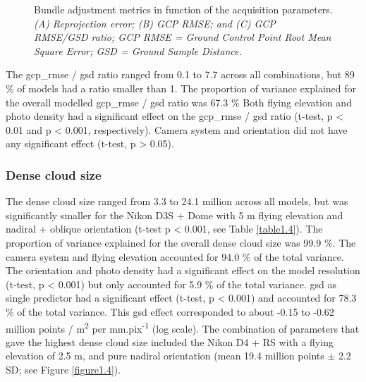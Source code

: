 \begin{figure}[ht]
	\caption[Bundle adjustment metrics in function of the acquisition parameters.]{Bundle adjustment metrics in function of the acquisition parameters. \textit{(A) Reprojection error; (B) GCP RMSE; and (C) GCP RMSE/GSD ratio; GCP RMSE = Ground Control Point Root Mean Square Error; GSD = Ground Sample Distance.}}
	\label{figure1.3}
    
\end{figure}

The \acrshort{gcp_rmse} / \acrshort{gsd} ratio ranged from 0.1 to 7.7 across all combinations, but 89 \% of models had a ratio smaller than 1. The proportion of variance explained for the overall modelled \acrshort{gcp_rmse} / \acrshort{gsd} ratio was 67.3 \% Both flying elevation and photo density had a significant effect on the \acrshort{gcp_rmse} / \acrshort{gsd} ratio (t-test, p < 0.01 and p < 0.001, respectively). Camera system and orientation did not have any significant effect (t-test, p > 0.05).
\subsubsection{Dense cloud size}\label{chapitre1_3.1.2}
The dense cloud size ranged from 3.3 to 24.1 million across all models, but was significantly smaller for the Nikon D3S + Dome with 5 m flying elevation and nadiral + oblique orientation (t-test p < 0.001, see Table \ref{table1.4}). The proportion of variance explained for the overall dense cloud size was 99.9 \%. The camera system and flying elevation accounted for 94.0 \% of the total variance. The orientation and photo density had a significant effect on the model resolution (t-test, p < 0.001) but only accounted for 5.9 \% of the total variance. \acrshort{gsd} as single predictor had a significant effect (t-test, p < 0.001) and accounted for 78.3 \% of the total variance. This \acrshort{gsd} effect corresponded to about -0.15 to -0.62 million points / m\textsuperscript{2} per mm.pix\textsuperscript{-1} (log scale). The combination of parameters that gave the highest dense cloud size included the Nikon D4 + RS with a flying elevation of 2.5 m, and pure nadiral orientation (mean 19.4 million points $\pm$ 2.2 SD; see Figure \ref{figure1.4}).

